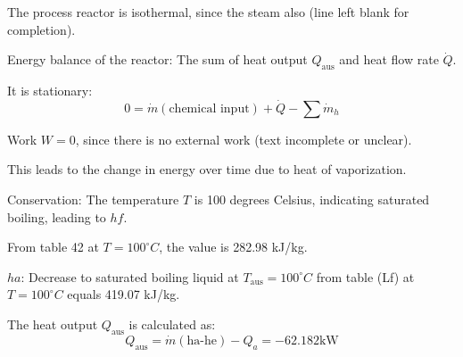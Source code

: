 The process reactor is isothermal, since the steam also (line left blank for completion).

Energy balance of the reactor:
The sum of heat output \( Q_{\text{aus}} \) and heat flow rate \( \dot{Q} \).

It is stationary:
\[ 0 = \dot{m} (\text{chemical input}) + \dot{Q} - \sum \dot{m}_h \]

Work \( W = 0 \), since there is no external work (text incomplete or unclear).

This leads to the change in energy over time due to heat of vaporization.

Conservation:
The temperature \( T \) is 100 degrees Celsius, indicating saturated boiling, leading to \( hf \).

From table 42 at \( T = 100^\circ C \), the value is 282.98 kJ/kg.

\( ha \): Decrease to saturated boiling liquid at \( T_{\text{aus}} = 100^\circ C \) from table (Lf) at \( T = 100^\circ C \) equals 419.07 kJ/kg.

The heat output \( Q_{\text{aus}} \) is calculated as:
\[ Q_{\text{aus}} = \dot{m} (\text{ha-he}) - Q_a = -62.182 \text{kW} \]